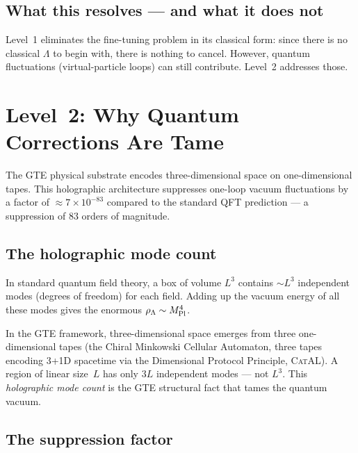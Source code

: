 \documentclass[11pt,a4paper]{article}
\newcommand{\CatAL}{\textsc{CatAL}}
\begin{document}
\subsection{What this resolves --- and what it does not}

Level~1 eliminates the fine-tuning problem in its classical form: since there
is no classical $\Lambda$ to begin with, there is nothing to cancel.  However,
quantum fluctuations (virtual-particle loops) can still contribute.
Level~2 addresses those.

\section{Level~2: Why Quantum Corrections Are Tame}
\label{sec:level2}

\begin{tcolorbox}[colback=boxblue,colframe=blue!40!black,
  title={Key idea}]
The GTE physical substrate encodes three-dimensional space on one-dimensional
tapes.  This holographic architecture suppresses one-loop vacuum fluctuations
by a factor of $\approx 7 \times 10^{-83}$ compared to the standard QFT
prediction --- a suppression of 83 orders of magnitude.
\end{tcolorbox}

\subsection{The holographic mode count}

In standard quantum field theory, a box of volume $L^3$ contains $\sim L^3$
independent modes (degrees of freedom) for each field.  Adding up the vacuum
energy of all these modes gives the enormous $\rho_\Lambda \sim M_{\rm Pl}^4$.

In the GTE framework, three-dimensional space emerges from three one-dimensional
tapes (the Chiral Minkowski Cellular Automaton, three tapes encoding 3+1D
spacetime via the Dimensional Protocol Principle, \CatAL).  A region of linear
size~$L$ has only $3L$ independent modes --- not $L^3$.  This \emph{holographic
mode count} is the GTE structural fact that tames the quantum vacuum.

\subsection{The suppression factor}
\end{document}
